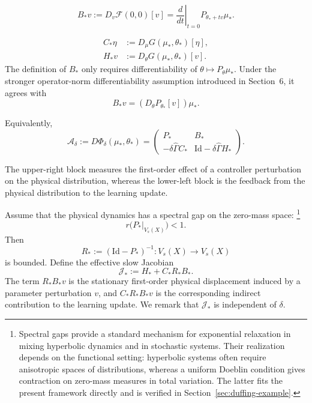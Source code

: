 \documentclass[11pt]{article}
\theoremstyle{definition}
\theoremstyle{remark}
\newcommand{\Id}{\mathrm{Id}}
\newcommand{\Gammahat}{\widehat{\Gamma}}
\begin{document}
\begin{equation}
  B_*v:=D_v\mathcal F(0,0)[v]
  =\left.\frac{d}{dt}\right|_{t=0}
    P_{\theta_*+tv}\mu_*.
  \label{eq:Bstar}
\end{equation}

\begin{align}
  C_*\eta&:=D_\mu G(\mu_*,\theta_*)[\eta],
  \label{eq:Cstar}\\
  H_*v&:=D_\theta G(\mu_*,\theta_*)[v].
  \label{eq:Hstar}
\end{align}
The definition of $B_*$ only requires differentiability
of $\theta\mapsto P_\theta\mu_*$.
Under the stronger operator-norm differentiability
assumption introduced in Section~6, it agrees with
\[
  B_*v=(D_\theta P_{\theta_*}[v])\mu_*.
\]

Equivalently,
\begin{equation}
  \mathcal A_\delta
  :=D\Phi_\delta(\mu_*,\theta_*)
  =
  \begin{pmatrix}
    P_* & B_*\\
    -\delta\Gammahat C_* &
    \Id-\delta\Gammahat H_*
  \end{pmatrix}.
  \label{eq:block-matrix}
\end{equation}

The upper-right block measures the first-order effect of a controller
perturbation on the physical distribution, whereas the lower-left block is the
feedback from the physical distribution to the learning update.

Assume that the physical dynamics has a spectral gap on the zero-mass space: \footnote{Spectral gaps provide a standard mechanism for exponential
relaxation in mixing hyperbolic dynamics and in stochastic
systems. Their realization depends on the functional
setting: hyperbolic systems often require anisotropic spaces of distributions, whereas a uniform Doeblin condition gives contraction on zero-mass measures in total variation. The latter fits the present framework
directly and is verified in
Section~\ref{sec:duffing-example}.}
\begin{equation}
  r\bigl(P_*|_{V_s(X)}\bigr)<1.
  \label{eq:fast-spectral-gap}
\end{equation}
Then
\[
  R_*:=(\Id-P_*)^{-1}:V_s(X)\to V_s(X)
\]
is bounded.  Define the effective slow Jacobian
\begin{equation}
  \boxed{
  \mathcal J_*:=H_*+C_*R_*B_*.}
  \label{eq:effective-slow-jacobian}
\end{equation}
The term \(R_*B_*v\) is the stationary first-order physical displacement
induced by a parameter perturbation \(v\), and \(C_*R_*B_*v\) is the
corresponding indirect contribution to the learning update. We remark that $\mathcal J_*$ is independent of $\delta$.
\end{document}
